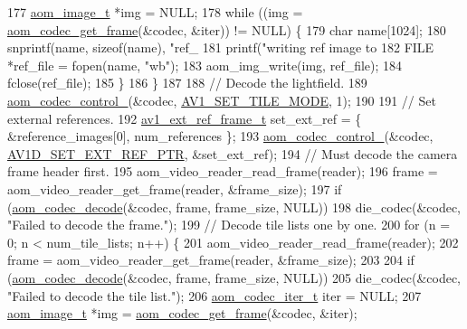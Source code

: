 \begin{DoxyCodeInclude}
{{{{177     \hyperlink{structaom__image}{aom\_image\_t} *img = NULL;
178     \textcolor{keywordflow}{while} ((img = \hyperlink{group__decoder_ga780aad27a2728abefab725faa3bc4f79}{aom\_codec\_get\_frame}(&codec, &iter)) != NULL) \{
179       \textcolor{keywordtype}{char} name[1024];
180       snprintf(name, \textcolor{keyword}{sizeof}(name), \textcolor{stringliteral}{"ref\_%
181       printf(\textcolor{stringliteral}{"writing ref image to %
182       FILE *ref\_file = fopen(name, \textcolor{stringliteral}{"wb"});
183       aom\_img\_write(img, ref\_file);
184       fclose(ref\_file);
185     \}
186   \}
187 
188   \textcolor{comment}{// Decode the lightfield.}
189   \hyperlink{group__codec_ga51eb332a40dcacc39000ab8e0be36b79}{aom\_codec\_control\_}(&codec, \hyperlink{group__aom__decoder_gga3865fd4b3192489baa9a5c3632ebe97ba0795d8084ae8c78528c01587198df9e2}{AV1\_SET\_TILE\_MODE}, 1);
190 
191   \textcolor{comment}{// Set external references.}
192   \hyperlink{structav1__ext__ref__frame}{av1\_ext\_ref\_frame\_t} set\_ext\_ref = \{ &reference\_images[0], num\_references \};
193   \hyperlink{group__codec_ga51eb332a40dcacc39000ab8e0be36b79}{aom\_codec\_control\_}(&codec, \hyperlink{group__aom__decoder_gga3865fd4b3192489baa9a5c3632ebe97badfbe6c1ebe4039bfef4d2cfd98755add}{AV1D\_SET\_EXT\_REF\_PTR}, &set\_ext\_ref);
194   \textcolor{comment}{// Must decode the camera frame header first.}
195   aom\_video\_reader\_read\_frame(reader);
196   frame = aom\_video\_reader\_get\_frame(reader, &frame\_size);
197   \textcolor{keywordflow}{if} (\hyperlink{group__decoder_gab03fdb999d1f83a5896869a3ba5f68f7}{aom\_codec\_decode}(&codec, frame, frame\_size, NULL))
198     die\_codec(&codec, \textcolor{stringliteral}{"Failed to decode the frame."});
199   \textcolor{comment}{// Decode tile lists one by one.}
200   \textcolor{keywordflow}{for} (n = 0; n < num\_tile\_lists; n++) \{
201     aom\_video\_reader\_read\_frame(reader);
202     frame = aom\_video\_reader\_get\_frame(reader, &frame\_size);
203 
204     \textcolor{keywordflow}{if} (\hyperlink{group__decoder_gab03fdb999d1f83a5896869a3ba5f68f7}{aom\_codec\_decode}(&codec, frame, frame\_size, NULL))
205       die\_codec(&codec, \textcolor{stringliteral}{"Failed to decode the tile list."});
206     \hyperlink{group__codec_gadf9e173c9e02788a9999399edab20a02}{aom\_codec\_iter\_t} iter = NULL;
207     \hyperlink{structaom__image}{aom\_image\_t} *img = \hyperlink{group__decoder_ga780aad27a2728abefab725faa3bc4f79}{aom\_codec\_get\_frame}(&codec, &iter);
}}}}}}
\end{DoxyCodeInclude}
